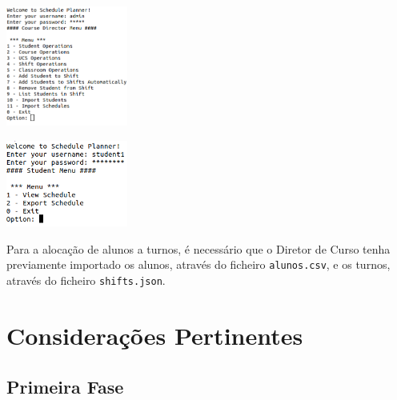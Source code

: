 \documentclass[a4paper,12pt]{scrreprt}
\begin{document}
\begin{minipage}{\textwidth}
    \centering
    \includegraphics[width=0.3\textwidth]{images/menu-dc.png}
    \label{fig:10-1-menu_principal-dc}
\end{minipage}

\begin{minipage}{\textwidth}
    \centering
    \includegraphics[width=0.3\textwidth]{images/menu-aluno.png}
    \label{fig:10-2-menu_principal-aluno}
\end{minipage}

Para a alocação de alunos a turnos, é necessário que o Diretor de Curso tenha previamente importado os alunos,
através do ficheiro \texttt{alunos.csv}, e os turnos, através do ficheiro \texttt{shifts.json}.





\chapter{Considerações Pertinentes}
\vspace{1cm}

\section{Primeira Fase}
\end{document}
